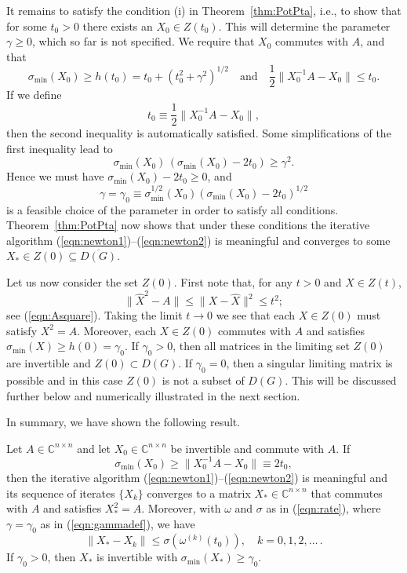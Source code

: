 \documentclass{siamltex}
\begin{document}
It remains to satisfy the condition (i) in Theorem~\ref{thm:PotPta}, i.e., to show that for some
$t_0>0$ there exists an $X_0\in Z(t_0)$. This will determine the parameter $\gamma\geq 0$, which
so far is not specified. We require that $X_0$ commutes with $A$, and that
$$\sigma_{\min}(X_0)\geq h(t_0)=t_0+(t_0^2+\gamma^2)^{1/2}\quad\mbox{and}\quad
\frac12 \|X_0^{-1}A-X_0\|\leq t_0.$$
If we define
$$t_0\equiv \frac12 \|X_0^{-1}A-X_0\|,$$
then the second inequality is automatically satisfied.
Some simplifications of the first inequality lead to
$$\sigma_{\min}(X_0)\,(\sigma_{\min}(X_0)-2t_0)\geq \gamma^2.$$
Hence we must have $\sigma_{\min}(X_0)-2t_0\geq 0$, and
\begin{equation}\label{eqn:gammadef}
\gamma=\gamma_0\equiv \sigma_{\min}^{1/2}(X_0)(\sigma_{\min}(X_0)-2t_0)^{1/2}
\end{equation}
is a feasible choice of the parameter in order to satisfy all conditions.
Theorem~\ref{thm:PotPta} now shows that under these conditions the
iterative algorithm (\ref{eqn:newton1})--(\ref{eqn:newton2}) is meaningful
and converges to some $X_*\in Z(0)\subseteq \overline{D(G)}$.

Let us now consider the set $Z(0)$. First note that, for any $t>0$ and $X\in Z(t)$,
$$\|\widehat{X}^2-A\|\leq \|X-\widehat{X}\|^2\leq t^2;$$
see (\ref{eqn:Asquare}). Taking the limit $t\rightarrow 0$ we see that each $X\in Z(0)$
must satisfy $X^2=A$. Moreover, each $X\in Z(0)$ commutes with $A$ and
satisfies $\sigma_{\min}(X)\geq h(0)=\gamma_0$. If $\gamma_0>0$, then all
matrices in the limiting set $Z(0)$ are invertible and $Z(0)\subset D(G)$.
If $\gamma_0=0$, then a singular limiting matrix is possible and in this case
$Z(0)$ is not a subset of $D(G)$. This will be discussed further below and numerically
illustrated in the next section.

In summary, we have shown the following result.

\medskip
\begin{theorem}\label{thm:main}
Let $A\in {\mathbb C}^{n\times n}$ and let $X_0\in {\mathbb C}^{n\times n}$
be invertible and commute with $A$. If
\begin{equation}\label{eqn:condition}
\sigma_{\min}(X_0)\geq \|X_0^{-1}A-X_0\|\equiv 2t_0,
\end{equation}
then the iterative algorithm (\ref{eqn:newton1})--(\ref{eqn:newton2})
is meaningful and its sequence of iterates $\{X_k\}$ converges
to a matrix $X_*\in {\mathbb C}^{n\times n}$ that
commutes with $A$ and satisfies $X_*^2=A$. Moreover,
with $\omega$ and $\sigma$ as in (\ref{eqn:rate}), where
$\gamma=\gamma_0$ as in (\ref{eqn:gammadef}), we have
\begin{equation}\label{eqn:bound}
\|X_*-X_k\|\leq \sigma(\omega^{(k)}(t_0)),\quad k=0,1,2,\dots\,.
\end{equation}
If $\gamma_0>0$, then $X_*$ is invertible with $\sigma_{\min}(X_*)\geq \gamma_0$.
\end{theorem}
\end{document}
